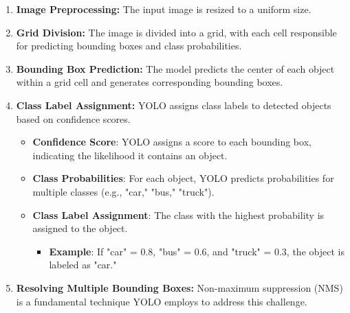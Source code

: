 \begin{enumerate}
  \item \textbf{Image Preprocessing:} The input image is resized to a uniform size.
  \item \textbf{Grid Division:} The image is divided into a grid, with each cell responsible for predicting bounding boxes and class probabilities.
  \item \textbf{Bounding Box Prediction:} The model predicts the center of each object within a grid cell and generates corresponding bounding boxes.
  \item \textbf{Class Label Assignment:} YOLO assigns class labels to detected objects based on confidence scores.
  \begin{itemize}
    \item \textbf{Confidence Score}: YOLO assigns a score to each bounding box, indicating the likelihood it contains an object.
    \item \textbf{Class Probabilities}: For each object, YOLO predicts probabilities for multiple classes (e.g., "car," "bus," "truck").
    \item \textbf{Class Label Assignment}: The class with the highest probability is assigned to the object.
    \begin{itemize}
       \item \textbf{Example}: If "car" = 0.8, "bus" = 0.6, and "truck" = 0.3, the object is labeled as "car."
    \end{itemize}
  \end{itemize}
  \item \textbf{Resolving Multiple Bounding Boxes:} Non-maximum suppression (NMS) is a fundamental technique YOLO employs to address this challenge.\\\\

\end{enumerate}
